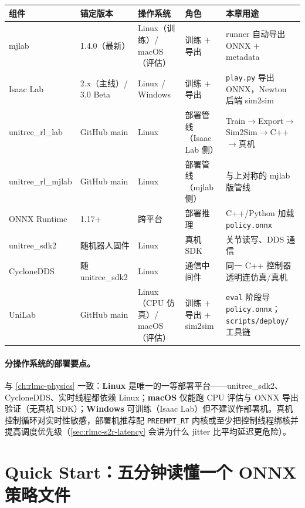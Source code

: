 \begin{center}
\small
\begin{tabular}{@{}lllll@{}}
\toprule
组件 & 锚定版本 & 操作系统 & 角色 & 本章用途 \\
\midrule
mjlab & 1.4.0（最新） & Linux（训练）/ macOS（评估） & 训练 $+$ 导出 & runner 自动导出 ONNX $+$ metadata \\
Isaac Lab & 2.x（主线）/ 3.0 Beta & Linux / Windows & 训练 $+$ 导出 & \verb|play.py| 导出 ONNX，Newton 后端 sim2sim \\
unitree\_rl\_lab & GitHub main & Linux & 部署管线（Isaac Lab 侧） & Train$\to$Export$\to$Sim2Sim$\to$C++$\to$真机 \\
unitree\_rl\_mjlab & GitHub main & Linux & 部署管线（mjlab 侧） & 与上对称的 mjlab 版管线 \\
ONNX Runtime & 1.17+ & 跨平台 & 部署推理 & C++/Python 加载 \verb|policy.onnx| \\
unitree\_sdk2 & 随机器人固件 & Linux & 真机 SDK & 关节读写、DDS 通信 \\
CycloneDDS & 随 unitree\_sdk2 & Linux & 通信中间件 & 同一 C++ 控制器透明连仿真/真机 \\
UniLab & GitHub main & Linux（CPU 仿真）/ macOS（评估） & 训练 $+$ 导出 $+$ sim2sim & \verb|eval| 阶段导 \verb|policy.onnx|；\verb|scripts/deploy/| 工具链 \\
\bottomrule
\end{tabular}
\end{center}

\paragraph{分操作系统的部署要点。}与 \cref{ch:rlmc-physics} 一致：\textbf{Linux} 是唯一的一等部署平台——unitree\_sdk2、CycloneDDS、实时线程都依赖 Linux；\textbf{macOS} 仅能跑 CPU 评估与 ONNX 导出验证（无真机 SDK）；\textbf{Windows} 可训练（Isaac Lab）但不建议作部署机。真机控制循环对实时性敏感，部署机推荐配 \verb|PREEMPT_RT| 内核或至少把控制线程绑核并提高调度优先级（\cref{sec:rlmc-s2r-latency} 会讲为什么 jitter 比平均延迟更危险）。

\section*{Quick Start：五分钟读懂一个 ONNX 策略文件}
\label{sec:rlmc-s2r-quickstart}

